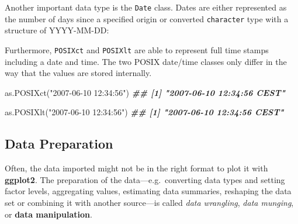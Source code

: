 \documentclass[
]{krantz}
\makeatletter
\newenvironment{Shaded}{\begin{snugshade}}{\end{snugshade}}
\newcommand{\AttributeTok}[1]{\textcolor[rgb]{0.61,0.61,0.61}{#1}}
\newcommand{\DecValTok}[1]{\textcolor[rgb]{0.06,0.06,0.06}{#1}}
\newcommand{\DocumentationTok}[1]{\textcolor[rgb]{0.37,0.37,0.37}{\textbf{\textit{#1}}}}
\newcommand{\FunctionTok}[1]{\textcolor[rgb]{0,0,0}{#1}}
\newcommand{\NormalTok}[1]{#1}
\newcommand{\SpecialCharTok}[1]{\textcolor[rgb]{0,0,0}{#1}}
\newcommand{\StringTok}[1]{\textcolor[rgb]{0.5,0.5,0.5}{#1}}
\newenvironment{kframe}{%
\medskip{}
\setlength{\fboxsep}{.8em}
 \def\at@end@of@kframe{}%
 \ifinner\ifhmode%
  \def\at@end@of@kframe{\end{minipage}}%
  \begin{minipage}{\columnwidth}%
 \fi\fi%
 \def\FrameCommand##1{\hskip\@totalleftmargin \hskip-\fboxsep
 \colorbox{shadecolor}{##1}\hskip-\fboxsep
     \hskip-\linewidth \hskip-\@totalleftmargin \hskip\columnwidth}%
 \MakeFramed {\advance\hsize-\width
   \@totalleftmargin\z@ \linewidth\hsize
   \@setminipage}}%
 {\par\unskip\endMakeFramed%
 \at@end@of@kframe}
\renewenvironment{Shaded}{\begin{kframe}}{\end{kframe}}
\makeatother
\begin{document}
Another important data type is the \texttt{Date} class. Dates are either represented as the number of days since a specified origin or converted \texttt{character} type with a structure of YYYY-MM-DD:

\begin{Shaded}
\end{Shaded}

Furthermore, \texttt{POSIXct} and \texttt{POSIXlt} are able to represent full time stamps including a date and time. The two POSIX date/time classes only differ in the way that the values are stored internally.

\begin{Shaded}
\begin{Highlighting}[]
\FunctionTok{as.POSIXct}\NormalTok{(}\StringTok{"2007{-}06{-}10 12:34:56"}\NormalTok{)}
\DocumentationTok{\#\# [1] "2007{-}06{-}10 12:34:56 CEST"}

\FunctionTok{as.POSIXlt}\NormalTok{(}\StringTok{"2007{-}06{-}10 12:34:56"}\NormalTok{)}
\DocumentationTok{\#\# [1] "2007{-}06{-}10 12:34:56 CEST"}
\end{Highlighting}
\end{Shaded}

\hypertarget{preparation}{%
\subsection{Data Preparation}\label{preparation}}

Often, the data imported might not be in the right format to plot it with \textbf{ggplot2}. The preparation of the data---e.g.~converting data types and setting factor levels, aggregating values, estimating data summaries, reshaping the data set or combining it with another source---is called \emph{data wrangling}, \emph{data munging}, or \textbf{data manipulation}.
\end{document}
